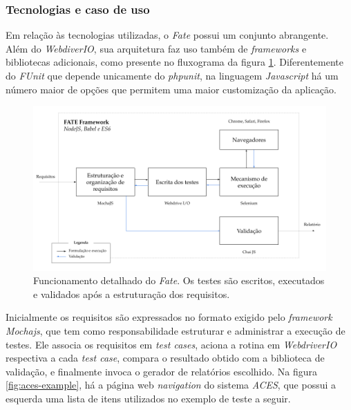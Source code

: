 \hypertarget{tecnologias-e-caso-de-uso}{%
\subsubsection{Tecnologias e caso de uso}\label{tecnologias-e-caso-de-uso}}

Em relação às tecnologias utilizadas, o \emph{Fate} possui um conjunto abrangente. Além do \emph{WebdiverIO}, sua arquitetura faz uso também de \emph{frameworks} e bibliotecas adicionais, como presente no fluxograma da figura \ref{fig:fate-framework}. Diferentemente do \emph{FUnit} que depende unicamente do \emph{phpunit}, na linguagem \emph{Javascript} há um número maior de opções que permitem uma maior customização da aplicação.

\begin{figure}[H]
    \centering
    \includegraphics[width=14.5cm]{source/4-solucao/images/fate-framework.png}
    \caption{Funcionamento detalhado do \emph{Fate}. Os testes são escritos, executados e validados após a estruturação dos requisitos.}
    \label{fig:fate-framework}
\end{figure}

Inicialmente os requisitos são expressados no formato exigido pelo \emph{framework Mochajs}, que tem como responsabilidade estruturar e administrar a execução de testes. Ele associa os requisitos em \emph{test cases}, aciona a rotina em \emph{WebdriverIO} respectiva a cada \emph{test case}, compara o resultado obtido com a biblioteca de validação, e finalmente invoca o gerador de relatórios escolhido. Na figura \ref{fig:aces-example}, há a página web \emph{navigation} do sistema \emph{ACES}, que possui a esquerda uma lista de itens utilizados no exemplo de teste a seguir.

